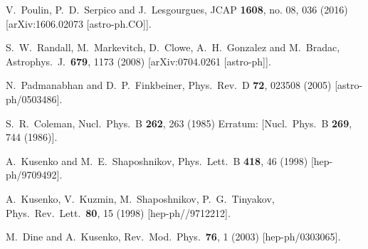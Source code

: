 \documentclass[twocolumn, preprintnumbers,amsmath,amssymb,prd, superscriptaddress]{revtex4}
\begin{document}
\begin{thebibliography}{99}
  V.~Poulin, P.~D.~Serpico and J.~Lesgourgues,
  JCAP {\bf 1608}, no. 08, 036 (2016)
  [arXiv:1606.02073 [astro-ph.CO]].


  S.~W.~Randall, M.~Markevitch, D.~Clowe, A.~H.~Gonzalez and M.~Bradac,
  Astrophys.\ J.\  {\bf 679}, 1173 (2008)
  [arXiv:0704.0261 [astro-ph]].


  N.~Padmanabhan and D.~P.~Finkbeiner,
  Phys.\ Rev.\ D {\bf 72}, 023508 (2005)
  [astro-ph/0503486].


  S.~R.~Coleman,
  Nucl.\ Phys.\ B {\bf 262}, 263 (1985)
  Erratum: [Nucl.\ Phys.\ B {\bf 269}, 744 (1986)].


  A.~Kusenko and M.~E.~Shaposhnikov,
  Phys.\ Lett.\ B {\bf 418}, 46 (1998)
  [hep-ph/9709492].


  A.~Kusenko, V.~Kuzmin, M.~Shaposhnikov, P.~G.~Tinyakov,
  Phys.\ Rev.\ Lett.\ {\bf 80}, 15 (1998)
  [hep-ph//9712212].


  M.~Dine and A.~Kusenko,
  Rev.\ Mod.\ Phys.\  {\bf 76}, 1 (2003)
  [hep-ph/0303065].



\end{thebibliography}
\end{document}
